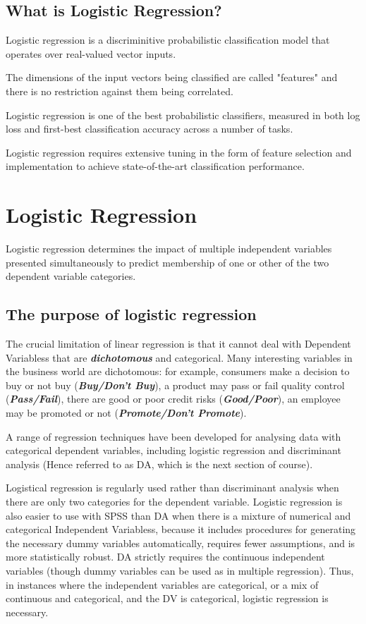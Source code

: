 \documentclass[a4paper,12pt]{article}
\begin{document}
\tableofcontents
\newpage
\subsection*{What is Logistic Regression?}
Logistic regression is a discriminitive probabilistic classification model that operates over real-valued vector inputs. 

The dimensions of the input vectors being classified are called "features" and there is no restriction against them being correlated. 

Logistic regression is one of the best probabilistic classifiers, measured in both log loss and first-best classification accuracy across a number of tasks.

Logistic regression requires extensive tuning in the form of feature selection and implementation to achieve state-of-the-art classification performance.

\section{Logistic Regression}
Logistic regression determines the impact of multiple independent variables
presented simultaneously to predict membership of one or other of the two
dependent variable categories.

\subsection{The purpose of logistic regression}
The crucial limitation of linear regression is that it cannot deal with Dependent Variabless that are \textbf{\textit{dichotomous}} and categorical. Many interesting variables in the business world are dichotomous: for
example, consumers make a decision to buy or not buy (\textit{\textbf{Buy/Don't Buy}}), a product may pass or fail quality control (\textit{\textbf{Pass/Fail}}), there are good or poor credit risks (\textit{\textbf{Good/Poor}}), an employee may be promoted or not (\textit{\textbf{Promote/Don't Promote}}).


A range of regression techniques have been developed for analysing data with categorical dependent
variables, including logistic regression and discriminant analysis (Hence referred to as DA, which is the next section of course).

Logistical regression is regularly used rather than discriminant analysis when there are only two categories
for the dependent variable. Logistic regression is also easier to use with SPSS than DA when
there is a mixture of numerical and categorical Independent Variabless, because it includes procedures for
generating the necessary dummy variables automatically, requires fewer assumptions, and
is more statistically robust. DA strictly requires the continuous independent variables  (though dummy variables can be used as in multiple regression). Thus, in instances where
the independent variables are categorical, or a mix of continuous and categorical, and the
DV is categorical, logistic regression is necessary.
\end{document}
